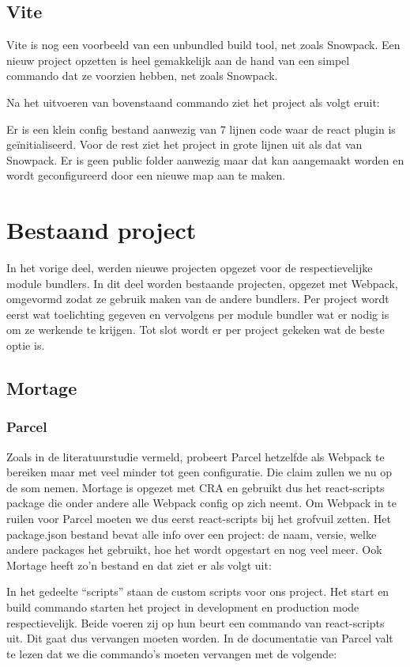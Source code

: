 \subsection{Vite}
Vite is nog een voorbeeld van een unbundled build tool, net zoals Snowpack. Een nieuw project opzetten is heel gemakkelijk aan de hand van een simpel commando dat ze voorzien hebben, net zoals Snowpack. 

Na het uitvoeren van bovenstaand commando ziet het project als volgt eruit:


Er is een klein config bestand aanwezig van 7 lijnen code waar de react plugin is geïnitialiseerd. Voor de rest ziet het project in grote lijnen uit als dat van Snowpack. Er is geen public folder aanwezig maar dat kan aangemaakt worden en wordt geconfigureerd door een nieuwe map aan te maken.


\section{Bestaand project}
In het vorige deel, werden nieuwe projecten opgezet voor de respectievelijke module bundlers. In dit deel worden bestaande projecten, opgezet met Webpack, omgevormd zodat ze gebruik maken van de andere bundlers. Per project wordt eerst wat toelichting gegeven en vervolgens per module bundler wat er nodig is om ze werkende te krijgen. Tot slot wordt er per project gekeken wat de beste optie is. 

\subsection{Mortage}

\subsubsection{Parcel}
Zoals in de literatuurstudie vermeld, probeert Parcel hetzelfde als Webpack te bereiken maar met veel minder tot geen configuratie. Die claim zullen we nu op de som nemen. Mortage is opgezet met CRA en gebruikt dus het react-scripts package die onder andere alle Webpack config op zich neemt. Om Webpack in te ruilen voor Parcel moeten we dus eerst react-scripts bij het grofvuil zetten. Het package.json bestand bevat alle info over een project: de naam, versie, welke andere packages het gebruikt, hoe het wordt opgestart en nog veel meer. Ook Mortage heeft zo’n bestand en dat ziet er als volgt uit:


In het gedeelte “scripts” staan de custom scripts voor ons project. Het start en build commando starten het project in development en production mode respectievelijk. Beide voeren zij op hun beurt een commando van react-scripts uit. Dit gaat dus vervangen moeten worden. In de documentatie van Parcel valt te lezen dat we die commando’s moeten vervangen met de volgende:

